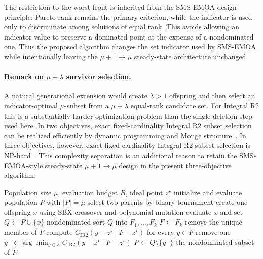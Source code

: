 \documentclass[runningheads]{llncs}
\newcommand{\IR}{\operatorname{IR2}}
\newcommand{\cIR}{C_{\IR}}
\begin{document}
The restriction to the worst front is inherited from the SMS-EMOA design principle: Pareto rank remains the primary criterion, while the indicator is used only to discriminate among solutions of equal rank. This avoids allowing an indicator value to preserve a dominated point at the expense of a nondominated one. Thus the proposed algorithm changes the set indicator used by SMS-EMOA while intentionally leaving the $\mu+1\rightarrow\mu$ steady-state architecture unchanged.

\paragraph{Remark on $\mu+\lambda$ survivor selection.}
A natural generational extension would create $\lambda>1$ offspring and then select an indicator-optimal $\mu$-subset from a $\mu+\lambda$ equal-rank candidate set. For Integral R2 this is a substantially harder optimization problem than the single-deletion step used here. In two objectives, exact fixed-cardinality Integral R2 subset selection can be realized efficiently by dynamic programming and Monge structure~\cite{Emmerich2026Subset2D}. In three objectives, however, exact fixed-cardinality Integral R2 subset selection is NP-hard~\cite{Emmerich2026Subset3D}. This complexity separation is an additional reason to retain the SMS-EMOA-style steady-state $\mu+1\rightarrow\mu$ design in the present three-objective algorithm.

\begin{algorithm}[t]
\caption{Integral R2 EMOA (IR2-EMOA)}
\label{alg:ir2emoa}
\begin{algorithmic}[1]
\Require Population size $\mu$, evaluation budget $B$, ideal point $z^\star$
\State initialize and evaluate population $P$ with $|P|=\mu$
    \State select two parents by binary tournament
    \State create one offspring $x$ using SBX crossover and polynomial mutation
    \State evaluate $x$ and set $Q\gets P\cup\{x\}$
    \State nondominated-sort $Q$ into $F_1,\ldots,F_k$
    \State $F\gets F_k$ 
        \State remove the unique member of $F$
    \Else
        \State compute $\cIR(y-z^\star\mid F-z^\star)$ for every $y\in F$
        \State remove one $y^-\in\arg\min_{y\in F}\cIR(y-z^\star\mid F-z^\star)$
    \EndIf
    \State $P\gets Q\setminus\{y^-\}$
\EndWhile
\State \Return the nondominated subset of $P$
\end{algorithmic}
\end{algorithm}
\end{document}

